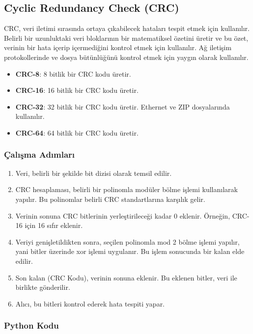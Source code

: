 \newpage

\subsection{Cyclic Redundancy Check (CRC)}

CRC, veri iletimi sırasında ortaya çıkabilecek hataları tespit etmek için kullanılır. Belirli bir uzunluktaki veri bloklarının bir matematiksel özetini üretir ve bu özet, verinin bir hata içerip içermediğini kontrol etmek için kullanılır. Ağ iletişim protokollerinde ve dosya bütünlüğünü kontrol etmek için yaygın olarak kullanılır.

\begin{itemize}
    \item \textbf{CRC-8}: 8 bitlik bir CRC kodu üretir.
    \item \textbf{CRC-16}: 16 bitlik bir CRC kodu üretir. 
    \item \textbf{CRC-32}: 32 bitlik bir CRC kodu üretir. Ethernet ve ZIP dosyalarında kullanılır.
    \item \textbf{CRC-64}: 64 bitlik bir CRC kodu üretir.
\end{itemize}

\subsubsection{Çalışma Adımları}

\begin{enumerate}
    \item Veri, belirli bir şekilde bit dizisi olarak temsil edilir.
    \item CRC hesaplaması, belirli bir polinomla modüler bölme işlemi kullanılarak yapılır. Bu polinomlar belirli CRC standartlarına karşılık gelir.
    \item Verinin sonuna CRC bitlerinin yerleştirileceği kadar 0 eklenir. Örneğin, CRC-16 için 16 sıfır eklenir.
    \item Veriyi genişletildikten sonra, seçilen polinomla mod 2 bölme işlemi yapılır, yani bitler üzerinde xor işlemi uygulanır. Bu işlem sonucunda bir kalan elde edilir.
    \item Son kalan (CRC Kodu), verinin sonuna eklenir. Bu eklenen bitler, veri ile birlikte gönderilir.
    \item Alıcı, bu bitleri kontrol ederek hata tespiti yapar.
\end{enumerate}

\subsubsection{Python Kodu}

